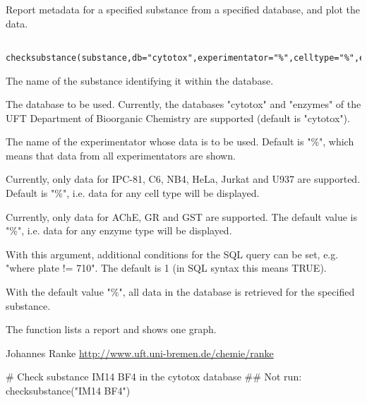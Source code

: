 \begin{Description}\relax
Report metadata for a specified substance from a specified database, and plot
the data.
\end{Description}
\begin{Usage}
\begin{verbatim}
  checksubstance(substance,db="cytotox",experimentator="%",celltype="%",enzymetype="%",whereClause="1",ok="%")
\end{verbatim}
\end{Usage}
\begin{Arguments}
\begin{ldescription}
\item[\code{substance}] The name of the substance identifying it within the database.
\item[\code{db}] The database to be used. Currently, the databases "cytotox" and "enzymes"
of the UFT Department of Bioorganic Chemistry are supported (default is
"cytotox").
\item[\code{experimentator}] The name of the experimentator whose data is to be used. Default is "\%", which
means that data from all experimentators are shown.
\item[\code{celltype}] Currently, only data for IPC-81, C6, NB4, HeLa, Jurkat and U937 are supported.
Default is "\%", i.e. data for any cell type will be displayed.
\item[\code{enzymetype}] Currently, only data for AChE, GR and GST are supported. The default value is "\%", i.e. data for any enzyme type will be displayed.
\item[\code{whereClause}] With this argument, additional conditions for the SQL query can be set, 
e.g. "where plate != 710". The default is 1 (in SQL syntax this means TRUE).
\item[\code{ok}] With the default value "\%", all data in the database is retrieved for the 
specified substance.
\end{ldescription}
\end{Arguments}
\begin{Value}
The function lists a report and shows one graph.
\end{Value}
\begin{Author}\relax
Johannes Ranke 
\url{http://www.uft.uni-bremen.de/chemie/ranke}
\end{Author}
\begin{Examples}
\begin{ExampleCode}
# Check substance IM14 BF4 in the cytotox database
## Not run: checksubstance("IM14 BF4")
\end{ExampleCode}
\end{Examples}

